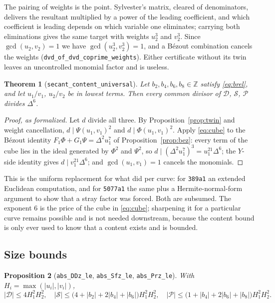 \documentclass[11pt,reqno]{amsart}
\theoremstyle{plain}
\newtheorem{theorem}{Theorem}[section]
\newtheorem{proposition}[theorem]{Proposition}
\theoremstyle{definition}
\theoremstyle{remark}
\DeclareRobustCommand{\lt}[1]{\texttt{#1}}
\newcommand{\DDz}{\mathcal{D}}
\newcommand{\Sfz}{\mathcal{S}}
\newcommand{\Prz}{\mathcal{P}}
\begin{document}
The pairing of weights is the point. Sylvester's matrix, cleared of
denominators, delivers the resultant multiplied by a power of the
leading coefficient, and which coefficient is leading depends on which
variable one eliminates; carrying both eliminations gives the same
target with weights $u_2^3$ and $v_2^3$. Since $\gcd(u_2,v_2) = 1$ we
have $\gcd(u_2^3,v_2^3) = 1$, and a B\'ezout combination cancels the
weights (\lt{dvd\_of\_dvd\_coprime\_weights}). Either certificate
without its twin leaves an uncontrolled monomial factor and is useless.

\begin{theorem}[\lt{secant\_content\_universal}]\label{thm:content}
Let $b_2,b_4,b_6,b_8 \in \mathbb{Z}$ satisfy \eqref{eq:brel}, and let
$u_1/v_1$, $u_2/v_2$ be in lowest terms. Then every common divisor of
$\DDz$, $\Sfz$, $\Prz$ divides $\Delta^6$.
\end{theorem}

\begin{proof}[Proof, as formalized]
Let $d$ divide all three. By Proposition~\ref{prop:twin} and weight
cancellation, $d \mid \Psi(u_1,v_1)^2$ and $d \mid \Phi(u_1,v_1)^2$.
Apply \eqref{eq:cube} to the B\'ezout identity
$F_1\Phi + G_1\Psi = \Delta^2u_1^7$ of Proposition~\ref{prop:bez}: every
term of the cube lies in the ideal generated by $\Phi^2$ and $\Psi^2$,
so $d \mid (\Delta^2u_1^7)^3 = u_1^{21}\Delta^6$; the $Y$-side identity
gives $d \mid v_1^{21}\Delta^6$; and $\gcd(u_1,v_1)=1$ cancels the
monomials.
\end{proof}

This is the uniform replacement for what \cite{MW} did per curve: for
\texttt{389a1} an extended Euclidean computation, and for
\texttt{5077a1} the same plus a Hermite-normal-form argument to show
that a stray factor was forced. Both are subsumed. The exponent $6$ is
the price of the cube in \eqref{eq:cube}; sharpening it for a particular
curve remains possible and is not needed downstream, because the content
bound is only ever used to know that a content exists and is bounded.

\subsection{Size bounds}\label{sec:size}

\begin{proposition}[\lt{abs\_DDz\_le}, \lt{abs\_Sfz\_le},
\lt{abs\_Prz\_le}]\label{prop:secupper}
With $H_i = \max(\lvert u_i\rvert, \lvert v_i\rvert)$,
\[
  \lvert\DDz\rvert \le 4H_1^2H_2^2, \quad
  \lvert\Sfz\rvert \le \bigl(4 + \lvert b_2\rvert + 2\lvert b_4\rvert
     + \lvert b_6\rvert\bigr)H_1^2H_2^2, \quad
  \lvert\Prz\rvert \le \bigl(1 + \lvert b_4\rvert + 2\lvert b_6\rvert
     + \lvert b_8\rvert\bigr)H_1^2H_2^2 .
\]
\end{proposition}
\end{document}
